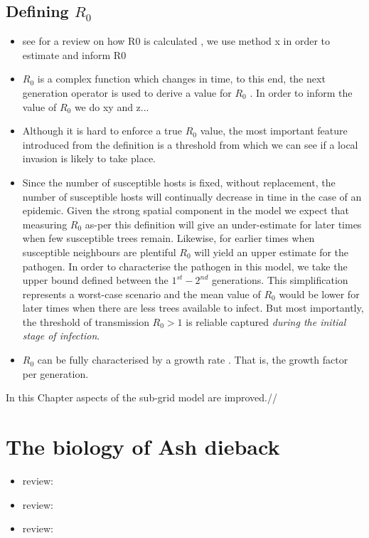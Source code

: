 \subsection{Defining $R_0$}

\begin{itemize}
    \item see for a review on how R0 is calculated \cite{perspectives-on-r0}, we use method x in order to estimate and inform R0
    \item $R_0$ is a complex function which changes in time, to this end, the next generation operator is used to derive a value for $R_0$ \cite{doi:10.1098/rsif.2009.0386}. In order to inform the value of $R_0$ we do xy and z...
    \item Although it is hard to enforce a true $R_0$ value, the most important feature introduced from the definition is a threshold from which we can see if a local invasion is likely to take place.
    \item Since the number of susceptible hosts is fixed, without replacement, the number of susceptible hosts will continually decrease in time in the case of an epidemic. Given the strong spatial component in the model we expect that measuring $R_0$ as-per this definition will give an under-estimate for later times when few susceptible trees remain. Likewise, for earlier times when susceptible neighbours are plentiful $R_0$ will yield an upper estimate for the pathogen. In order to characterise the pathogen in this model, we take the upper bound defined between the $1^{st}-2^{nd}$ generations. This simplification represents a worst-case scenario and the mean value of $R_0$ would be lower for later times when there are less trees available to infect. But most importantly, the threshold of transmission $R_0>1$ is reliable captured \textit{during the initial stage of infection}.
    \item $R_0$ can be fully characterised by a growth rate \cite{R0-construct}. That is, the growth factor per generation.
    
\end{itemize}


In this Chapter aspects of the sub-grid model are improved.//
\section{The biology of Ash dieback} %
\begin{itemize}
    \item review: \cite{ash-dieback-costs}
    \item review: \cite{doi:10.1111/1365-2745.13383}
    \item review: \cite{ash-tree1}
\end{itemize}

